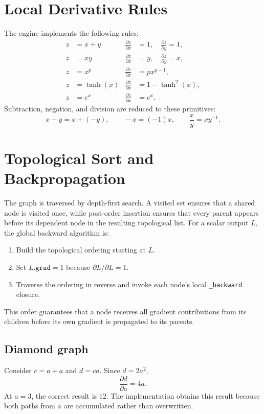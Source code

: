 \documentclass[11pt,a4paper]{article}
\begin{document}
\section{Local Derivative Rules}
The engine implements the following rules:
\begin{align*}
z &= x+y &
\frac{\partial z}{\partial x} &= 1,\quad
\frac{\partial z}{\partial y}=1,\\
z &= xy &
\frac{\partial z}{\partial x} &= y,\quad
\frac{\partial z}{\partial y}=x,\\
z &= x^p &
\frac{\partial z}{\partial x} &= p x^{p-1},\\
z &= \tanh(x) &
\frac{\partial z}{\partial x} &= 1-\tanh^2(x),\\
z &= e^x &
\frac{\partial z}{\partial x} &= e^x.
\end{align*}
Subtraction, negation, and division are reduced to these primitives:
\[
x-y=x+(-y),\qquad
-x=(-1)x,\qquad
\frac{x}{y}=x y^{-1}.
\]

\section{Topological Sort and Backpropagation}
The graph is traversed by depth-first search. A visited set ensures that a
shared node is visited once, while post-order insertion ensures that every
parent appears before its dependent node in the resulting topological list.
For a scalar output $L$, the global backward algorithm is:
\begin{enumerate}
  \item Build the topological ordering starting at $L$.
  \item Set $L.\texttt{grad}=1$ because $\partial L/\partial L=1$.
  \item Traverse the ordering in reverse and invoke each node's local
        \texttt{\_backward} closure.
\end{enumerate}
This order guarantees that a node receives all gradient contributions from
its children before its own gradient is propagated to its parents.

\subsection{Diamond graph}
Consider $c=a+a$ and $d=ca$. Since $d=2a^2$,
\[
\frac{\partial d}{\partial a}=4a.
\]
At $a=3$, the correct result is $12$. The implementation obtains this result
because both paths from $a$ are accumulated rather than overwritten.
\end{document}
